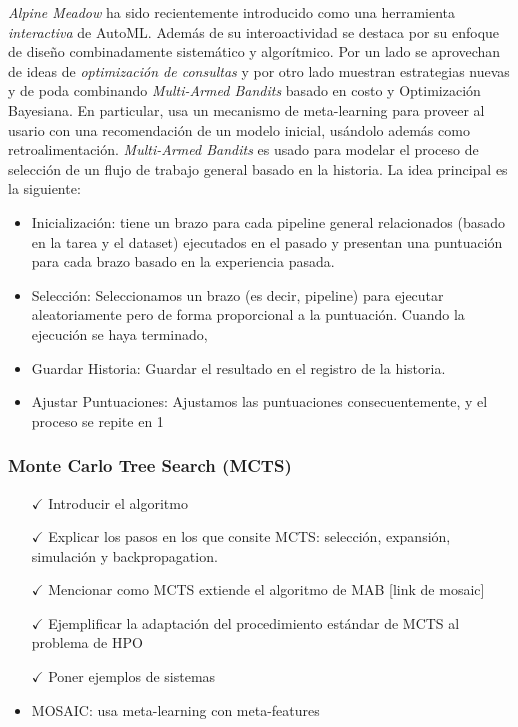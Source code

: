 \textit{Alpine Meadow} \cite{shang2019democratizing} ha sido recientemente introducido como una herramienta \emph{interactiva} de AutoML. Además de su interoactividad se destaca por su enfoque de diseño combinadamente sistemático y algorítmico. Por un lado se aprovechan de ideas de \textit{optimización de consultas} y por otro lado muestran estrategias nuevas y de poda combinando \textit{Multi-Armed Bandits} basado en costo y Optimización Bayesiana. En particular, usa un mecanismo de meta-learning para proveer al usario con una recomendación de un modelo inicial, usándolo además como retroalimentación. \textit{Multi-Armed Bandits} es usado para modelar el proceso de selección de un flujo de trabajo general basado en la historia. La idea principal es la siguiente: 
\begin{itemize}
	\item Inicialización: tiene un brazo para cada pipeline general relacionados (basado en la tarea y el dataset) ejecutados en el pasado y presentan una puntuación para cada brazo basado en la experiencia pasada.
	\item Selección: Seleccionamos un brazo (es decir, pipeline) para ejecutar aleatoriamente pero de forma proporcional a la puntuación. Cuando la ejecución se haya terminado,
	\item Guardar Historia: Guardar el resultado en el registro de la historia.
	\item Ajustar Puntuaciones: Ajustamos las puntuaciones consecuentemente, y el proceso se repite en 1
\end{itemize}


\subsubsection{Monte Carlo Tree Search (MCTS)}


\begin{itemize}
	\item[$\checkmark$] Introducir el algoritmo
	\item[$\checkmark$] Explicar los pasos en los que consite MCTS: selección, expansión, simulación y backpropagation.
	\item[$\checkmark$] Mencionar como MCTS extiende el algoritmo de MAB [link de mosaic]
	\item[$\checkmark$] Ejemplificar la adaptación del procedimiento estándar de MCTS al problema de HPO 
	\item[$\checkmark$] Poner ejemplos de sistemas
	\item MOSAIC: usa meta-learning con meta-features
\end{itemize}

